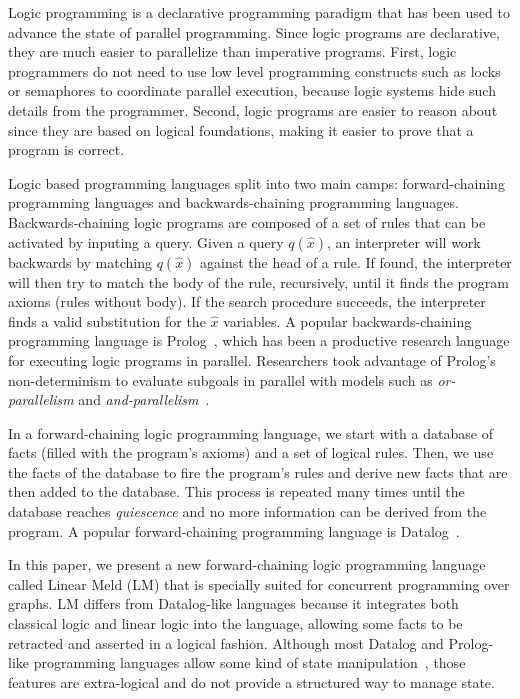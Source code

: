 Logic programming is a declarative programming paradigm that has been used to advance the state of parallel programming.
Since logic programs are declarative, they are much easier to parallelize than imperative programs. First, logic programmers do not
need to use low level programming constructs such as locks or semaphores to coordinate parallel execution, because logic
systems hide such details from the programmer. Second, logic programs are easier to reason about since they are based on logical
foundations, making it easier to prove that a program is correct.

Logic based programming languages split into two main camps: forward-chaining programming languages and backwards-chaining 
programming languages. Backwards-chaining logic programs are composed of a set of rules that can be activated by inputing a query. Given a query $q(\hat{x})$, an interpreter will work backwards by matching $q(\hat{x})$ against the head of a rule. If found, the interpreter will then try to match the body of the rule, recursively, until it finds the program axioms (rules without body). If the search procedure succeeds, the interpreter finds a valid substitution for the $\hat{x}$ variables. A popular backwards-chaining programming
language is Prolog~\cite{Colmerauer:1993:BP:154766.155362}, which has been a productive research language for executing logic
programs in parallel. Researchers took advantage of Prolog's non-determinism to evaluate subgoals
in parallel with models such as \emph{or-parallelism} and \emph{and-parallelism}~\cite{Gupta:2001:PEP:504083.504085}.

In a forward-chaining logic programming language, we start with a database of facts (filled with the program's
axioms) and a set of logical rules. Then, we use the facts of the database to fire the program's rules and derive new facts that are
then added to the database. This process is repeated many times until the database reaches \emph{quiescence} and no more information can
be derived from the program.
A popular forward-chaining programming language is Datalog~\cite{Ramakrishnan93asurvey}.

In this paper, we present a new forward-chaining logic programming language called Linear Meld (LM) that is specially suited
for concurrent programming over graphs. LM differs from Datalog-like languages because it integrates both classical
logic and linear logic into the language, allowing some facts to be retracted and asserted in a logical fashion. Although most
Datalog and Prolog-like programming languages allow some kind of state manipulation~\cite{Liu98extendingdatalog}, those features
are extra-logical and do not provide a structured way to manage state.

